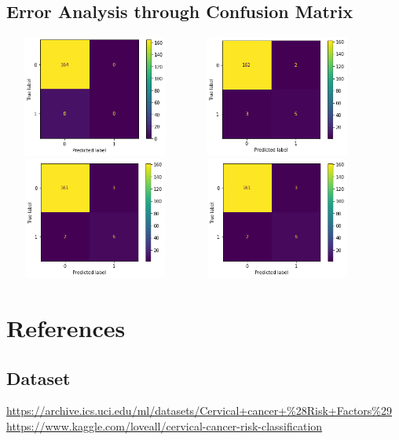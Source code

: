 \documentclass{article}
\begin{document}
\subsection*{Error Analysis through Confusion Matrix}
\includegraphics[width=6cm, height=4cm]{Logistic.png}
\includegraphics[width=6cm, height=4cm]{SVC.png}
\includegraphics[width=6cm, height=4cm]{RandomForest.png}
\includegraphics[width=6cm, height=4cm]{GradientBoosting.png}

\section*{References}
\subsection*{Dataset}
\url{https://archive.ics.uci.edu/ml/datasets/Cervical+cancer+%28Risk+Factors%29 }
\url{https://www.kaggle.com/loveall/cervical-cancer-risk-classification}
\end{document}
